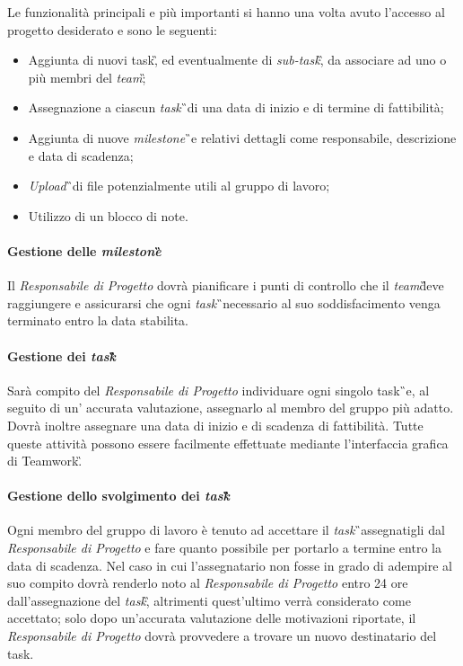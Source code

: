 Le funzionalità principali e più importanti si hanno una volta avuto l'accesso al progetto desiderato e sono le seguenti:
\begin{itemize}
\item Aggiunta di nuovi task\G, ed eventualmente di \textit{sub-task}\G, da associare ad uno o più membri del \textit{team}\G;

\item Assegnazione a ciascun \textit{task}\G\ di una data di inizio e di termine di fattibilità;

\item Aggiunta di nuove \textit{milestone}\G\ e relativi dettagli come responsabile, descrizione e data di scadenza;

\item \textit{Upload}\G\ di file potenzialmente utili al gruppo di lavoro;

\item Utilizzo di un blocco di note.
 
\end{itemize}

\paragraph{Gestione delle \textit{milestone}\G} 
Il \textit{Responsabile di Progetto} dovrà pianificare i punti di controllo che il \textit{team}\G deve raggiungere e assicurarsi che ogni \textit{task}\G\ necessario al suo soddisfacimento venga terminato entro la data stabilita.

\paragraph{Gestione dei \textit{task}\G} 
Sarà compito del \textit{Responsabile di Progetto} individuare ogni singolo task\G\ e, al seguito di un' accurata valutazione, assegnarlo al membro del gruppo più adatto. Dovrà inoltre assegnare una data di inizio e di scadenza di fattibilità. Tutte queste attività possono essere facilmente effettuate mediante l'interfaccia grafica di Teamwork\G.

\paragraph{Gestione dello svolgimento dei \textit{task}\G}
Ogni membro del gruppo di lavoro è tenuto ad accettare il \textit{task}\G\ assegnatigli dal \textit{Responsabile di Progetto} e fare quanto possibile per portarlo a termine entro la data di scadenza. Nel caso in cui l'assegnatario non fosse in grado di adempire al suo compito dovrà renderlo noto al \textit{Responsabile di Progetto} entro 24 ore dall'assegnazione del \textit{task}\G, altrimenti quest'ultimo verrà considerato come accettato; solo dopo un'accurata valutazione delle motivazioni riportate, il \textit{Responsabile di Progetto} dovrà provvedere a trovare un nuovo destinatario del task.

